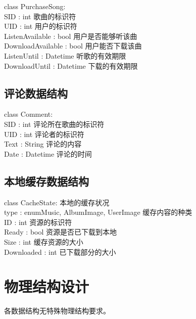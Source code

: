 class PurchaseSong:\\
\indent \indent    SID : int           歌曲的标识符\\
\indent \indent    UID : int           用户的标识符\\
\indent \indent    ListenAvailable : bool    用户是否能够听该曲\\
\indent \indent    DownloadAvailable : bool  用户能否下载该曲\\
\indent \indent    ListenUntil : Datetime    听歌的有效期限\\
\indent \indent    DownloadUntil : Datetime  下载的有效期限

\subsection{评论数据结构}

class Comment:\\
\indent \indent    SID : int           评论所在歌曲的标识符\\
\indent \indent    UID : int           评论者的标识符\\
\indent \indent    Text : String       评论的内容\\
\indent \indent    Date : Datetime     评论的时间

\subsection{本地缓存数据结构}

class CacheState:       本地的缓存状况\\
\indent \indent    type : enum{Music, AlbumImage, UserImage}
\indent \indent                        缓存内容的种类\\
\indent \indent    ID : int            资源的标识符\\
\indent \indent    Ready : bool        资源是否已下载到本地\\
\indent \indent    Size : int          缓存资源的大小\\
\indent \indent    Downloaded : int    已下载部分的大小

\section{物理结构设计}
各数据结构无特殊物理结构要求。

